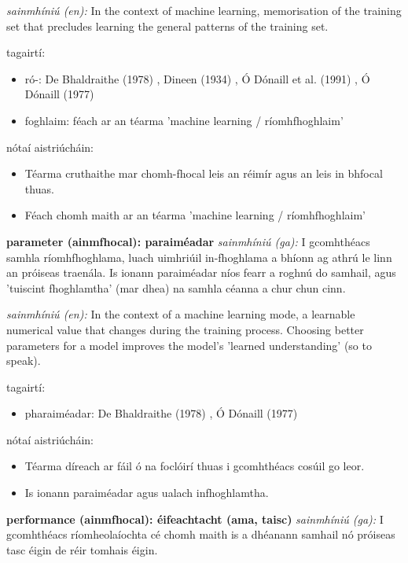 \documentclass{article}
\begin{document}
\textit{sainmhíniú (en):} In the context of machine learning, memorisation of the training set that precludes learning the general patterns of the training set.

tagairtí:
\begin{itemize}
	\item ró-: De Bhaldraithe (1978) \cite{de-bhaldraithe}, Dineen (1934) \cite{dineen}, Ó Dónaill et al. (1991) \cite{focloir-beag}, Ó Dónaill (1977) \cite{odonaill}
	\item foghlaim: féach ar an téarma 'machine learning / ríomhfhoghlaim'
\end{itemize}

nótaí aistriúcháin:
\begin{itemize}
	\item Téarma cruthaithe mar chomh-fhocal leis an réimír agus an leis in bhfocal thuas.
	\item Féach chomh maith ar an téarma 'machine learning / ríomhfhoghlaim'
\end{itemize}


\textbf{parameter (ainmfhocal): paraiméadar}
\textit{sainmhíniú (ga):} I gcomhthéacs samhla ríomhfhoghlama, luach uimhriúil in-fhoghlama a bhíonn ag athrú le linn an próiseas traenála. Is ionann paraiméadar níos fearr a roghnú do samhail, agus 'tuiscint fhoghlamtha' (mar dhea) na samhla céanna a chur chun cinn.

\textit{sainmhíniú (en):} In the context of a machine learning mode, a learnable numerical value that changes during the training process. Choosing better parameters for a model improves the model's 'learned understanding' (so to speak).

tagairtí:
\begin{itemize}
	\item pharaiméadar: De Bhaldraithe (1978) \cite{de-bhaldraithe}, Ó Dónaill (1977) \cite{odonaill}
\end{itemize}

nótaí aistriúcháin:
\begin{itemize}
	\item Téarma díreach ar fáil ó na foclóirí thuas i gcomhthéacs cosúil go leor.
	\item Is ionann paraiméadar agus ualach infhoghlamtha.
\end{itemize}


\textbf{performance (ainmfhocal): éifeachtacht (ama, taisc)}
\textit{sainmhíniú (ga):} I gcomhthéacs ríomheolaíochta cé chomh maith is a dhéanann samhail nó próiseas tasc éigin de réir tomhais éigin.
\end{document}

